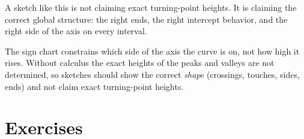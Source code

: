 \documentclass[12pt]{book}
\begin{document}
A sketch like this is not claiming exact turning-point heights. It is claiming the
correct global structure: the right ends, the right intercept behavior, and the right
side of the axis on every interval.

\begin{center}
\end{center}

\begin{pitfall}
The sign chart constrains which side of the axis the curve is on, not how high it
rises. Without calculus the exact heights of the peaks and valleys are not
determined, so sketches should show the correct \emph{shape} (crossings, touches,
sides, ends) and not claim exact turning-point heights.
\end{pitfall}

\section{Exercises}
\end{document}
